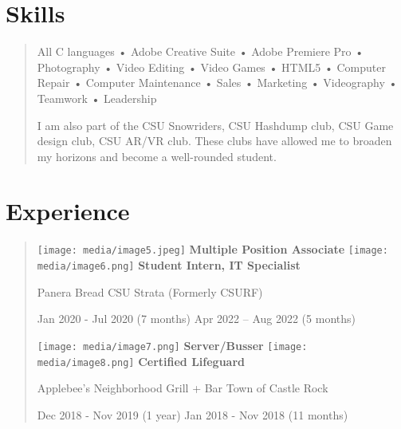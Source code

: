 \documentclass[
]{article}
\begin{document}
\hypertarget{skills}{%
\section{Skills}\label{skills}}

\begin{quote}
All C languages • Adobe Creative Suite • Adobe Premiere Pro •
Photography • Video Editing • Video Games • HTML5 • Computer Repair •
Computer Maintenance • Sales • Marketing • Videography • Teamwork •
Leadership

I am also part of the CSU Snowriders, CSU Hashdump club, CSU Game design
club, CSU AR/VR club. These clubs have allowed me to broaden my horizons
and become a well-rounded student.
\end{quote}

\hypertarget{experience}{%
\section{Experience}\label{experience}}

\begin{quote}
\texttt{[image: media/image5.jpeg]}
\textbf{Multiple Position Associate}
\texttt{[image: media/image6.png]}
\textbf{Student Intern, IT Specialist}

Panera Bread CSU Strata (Formerly CSURF)

Jan 2020 - Jul 2020 (7 months) Apr 2022 -- Aug 2022 (5 months)

\texttt{[image: media/image7.png]}
\textbf{Server/Busser}
\texttt{[image: media/image8.png]}
\textbf{Certified Lifeguard}

Applebee's Neighborhood Grill + Bar Town of Castle Rock

Dec 2018 - Nov 2019 (1 year) Jan 2018 - Nov 2018 (11 months)
\end{quote}
\end{document}
